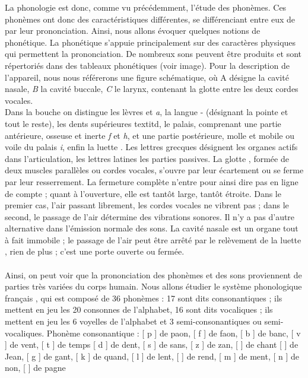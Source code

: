 \documentclass[12pt, french, twoside]{report}
\begin{document}
La phonologie est donc, comme vu précédemment, l'étude des phonèmes. Ces phonèmes ont donc des caractéristiques différentes, se différenciant entre eux de par leur prononciation. Ainsi, nous allons évoquer quelques notions de phonétique. La phonétique s'appuie principalement sur des caractères physiques qui permettent la prononciation. De nombreux sons peuvent être produits et sont répertoriés dans des tableaux phonétiques (voir image). 
Pour la description de l’appareil, nous nous référerons une figure schématique, où A désigne la cavité nasale, \textit{B} la cavité buccale, \textit{C} le larynx, contenant la glotte \varepsilon entre les deux cordes vocales. \\
Dans la bouche on distingue les lèvres \alpha et \textit{a}, la langue \beta - \gamma (\beta désignant la pointe et \gamma tout le reste), les dents supérieures textit{d}, le palais, comprenant une partie antérieure, osseuse et inerte \textit{f} et \textit{h}, et une partie postérieure, molle et mobile ou voile du palais \textit{i}, enfin la luette \delta .
Les lettres grecques désignent les organes actifs dans l’articulation, les lettres latines les parties passives. La glotte \varepsilon , formée de deux muscles parallèles ou cordes vocales, s’ouvre par leur écartement ou se ferme par leur resserrement. La fermeture complète n’entre pour ainsi dire pas en ligne de compte ; quant à l’ouverture, elle est tantôt large, tantôt étroite. Dans le premier cas, l’air passant librement, les cordes vocales ne vibrent pas ; dans le second, le passage de l’air détermine des vibrations sonores. Il n’y a pas d’autre alternative dans l’émission normale des sons. La cavité nasale est un organe tout à fait immobile ; le passage de l’air peut être arrêté par le relèvement de la luette \delta , rien de plus ; c’est une porte ouverte ou fermée. \\ \\    Ainsi, on peut voir que la prononciation des phonèmes et des sons proviennent de parties très variées du corps humain. Nous allons étudier le système phonologique français , qui est composé de 36 phonèmes : 17 sont dits consonantiques ; ils mettent en jeu les 20 consonnes de l’alphabet, 16 sont dits vocaliques ; ils mettent en jeu les 6 voyelles de l’alphabet et 3 semi-consonantiques ou semi-vocaliques. 
Phonème consonantique : [ p ] de paon, [ f ] de faon,  [ b ] de banc, [ v ] de vent, [ t ] de temps [ d ] de dent,  [ s ] de sans, [ z ] de zan, [ \textesh  ] de chant [ \textyogh  ] de Jean,  [ g ] de gant, [ k ] de quand,  [ l ] de lent, [ \textscr ] de rend,  [ m ] de ment, [ n ] de non,  [ \textltailn ] de pagne
\end{document}
